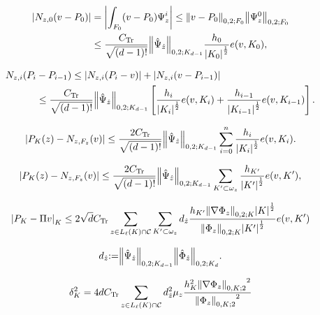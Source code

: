 \documentclass[a4paper]{article}
\begin{document}
\begin{align*}
 |{N}_{z,0}(v-P_0)|
 &=
 \left|
  \int_{{F}_0} (v-P_0) {\Psi}^i_z
 \right|
 \leq
 {{\left\|{{v-P_0}}\right\|_{{0,2;{{F}_0}}}}} {{\left\|{{{\Psi}^0_z}}\right\|_{{0,2;{{F}_0}}}}}
\\
 &\leq
 \frac{{C_\text{Tr}}}{\sqrt{(d-1)!}}
 {{\left\|{{\Hat{\Psi}_{\Hat z}}}\right\|_{{0,2;{{K}_{d-1}}}}}}
 \frac{h_{0}}{{\left|{{K}_0}\right|}^{\frac12}}
  e(v,{K}_0),
\end{align*}

\begin{equation*}\begin{aligned}
 {N}_{z,i}(P_i &- P_{i-1})
 \leq
 |{N}_{z,i}(P_i - v)| + |{N}_{z,i}(v - P_{i-1})|
\\
 &\leq
 \frac{{C_\text{Tr}}}{\sqrt{(d-1)!}}
 {{\left\|{{\Hat{\Psi}_{\Hat z}}}\right\|_{{0,2;{{K}_{d-1}}}}}}
 \left[
  \frac{h_{i}}{{\left|{{K}_i}\right|}^{\frac12}} e(v,{K}_i)
  +
  \frac{h_{i-1}}{{\left|{{K}_{i-1}}\right|}^{\frac12}} e(v,{K}_{i-1})
 \right].
\end{aligned}\end{equation*}

\[
 |P_{K}(z)-{N}_{z,{F}_z}(v)|
 \leq
 \frac{2{{C_\text{Tr}}}}{\sqrt{(d-1)!}}
 {{\left\|{{\Hat{\Psi}_{\Hat z}}}\right\|_{{0,2;{{K}_{d-1}}}}}}
 \sum_{i=0}^n 
  \frac{h_{i}}{{\left|{{K}_i}\right|}^{\frac12}} e(v,{K}_i).
\]

\begin{equation}\label{nbnval}
 |P_{K}(z)-{N}_{z,{F}_z}(v)|
 \leq
 \frac{2{{C_\text{Tr}}}}{\sqrt{(d-1)!}}
 {{\left\|{{\Hat{\Psi}_{\Hat z}}}\right\|_{{0,2;{{K}_{d-1}}}}}}
  \sum_{{K}'\subset\omega_z}
   \frac{h_{{K}'}}{{\left|{{K}'}\right|}^{\frac12}}
   e(v,{K}'),
\end{equation}

\begin{equation*}
 {\left|{P_{K} - {\Pi} v}\right|_{K}}
 \leq
 2 \sqrt{d} {{C_\text{Tr}}}
 \sum_{z\in{L_{{\ell}}}({K})\cap{\mathcal{C}}}
 \sum_{{K}'\subset\omega_z}
  d_{\Hat z}
   \frac{h_{{K}'} {{\left\|{{{\nabla}{\Phi}_z}}\right\|_{{0,2;{K}}}}} {\left|{K}\right|}^{\frac12}}
   {{{\left\|{{{\Phi}_z}}\right\|_{{0,2;{K}}}}} {\left|{{K}'}\right|}^{\frac12}}
   e(v,{K}')
\end{equation*}

\[
 d_{\Hat z}
 {:=}
 {{\left\|{{\Hat{\Psi}_{\Hat z}}}\right\|_{{0,2;{{K}_{d-1}}}}}}
 {{\left\|{{\Hat{\Phi}_{\Hat z}}}\right\|_{{0,2;{{{K}_d}}}}}}.
\]

\begin{equation}
\label{locDcplngConst}
 {\delta}_{K}^2
 =
 4 d {{C_\text{Tr}}}
 \sum_{z\in{L_{{\ell}}}({K})\cap{\mathcal{C}}}
  d_{\Hat z}^2 \mu_z
  \frac{h_{K}^2 {{\left\|{{{\nabla}{\Phi}_z}}\right\|_{{0,{K};2}}}}^2}
   {{{\left\|{{{\Phi}_z}}\right\|_{{0,{K};2}}}}^2}
\end{equation}
\end{document}
